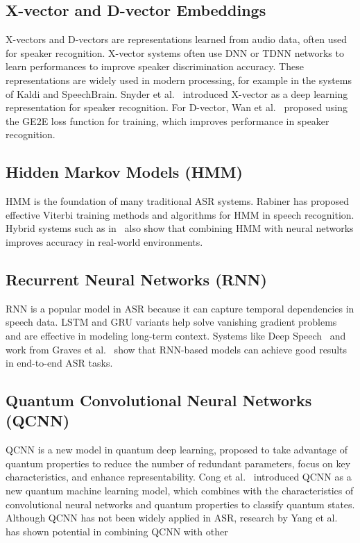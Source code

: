 \documentclass[conference]{IEEEtran}
\begin{document}
\subsection{X-vector and D-vector Embeddings}

X-vectors and D-vectors are representations learned from audio data, often used for speaker recognition. X-vector systems often use DNN or TDNN networks to learn performances to improve speaker discrimination accuracy. These representations are widely used in modern processing, for example in the systems of Kaldi and SpeechBrain. Snyder et al.~\cite{Snyder2018Xvectors} introduced X-vector as a deep learning representation for speaker recognition. For D-vector, Wan et al.~\cite{Wan2018Generalized} proposed using the GE2E loss function for training, which improves performance in speaker recognition.

\subsection{Hidden Markov Models (HMM)}

HMM is the foundation of many traditional ASR systems. Rabiner \cite{rabiner1989tutorial} has proposed effective Viterbi training methods and algorithms for HMM in speech recognition. Hybrid systems such as in~\cite{voll2007hybrid, perero2022comparison} also show that combining HMM with neural networks improves accuracy in real-world environments.

\subsection{Recurrent Neural Networks (RNN)}

RNN is a popular model in ASR because it can capture temporal dependencies in speech data. LSTM and GRU variants help solve vanishing gradient problems and are effective in modeling long-term context. Systems like Deep Speech~\cite{hannun2014deep} and work from Graves et al.~\cite{graves2013speech} show that RNN-based models can achieve good results in end-to-end ASR tasks.

\subsection{Quantum Convolutional Neural Networks (QCNN)}

QCNN is a new model in quantum deep learning, proposed to take advantage of quantum properties to reduce the number of redundant parameters, focus on key characteristics, and enhance representability. Cong et al.~\cite{Cong2019QuantumCNN} introduced QCNN as a new quantum machine learning model, which combines with the characteristics of convolutional neural networks and quantum properties to classify quantum states. Although QCNN has not been widely applied in ASR, research by Yang et al.~\cite{Yang2021Decentralizing} has shown potential in combining QCNN with other
\end{document}
